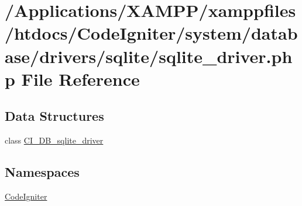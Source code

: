 \hypertarget{sqlite__driver_8php}{}\section{/\+Applications/\+X\+A\+M\+P\+P/xamppfiles/htdocs/\+Code\+Igniter/system/database/drivers/sqlite/sqlite\+\_\+driver.php File Reference}
\label{sqlite__driver_8php}
\subsection*{Data Structures}
\begin{DoxyCompactItemize}
\item 
class \mbox{\hyperlink{class_c_i___d_b__sqlite__driver}{C\+I\+\_\+\+D\+B\+\_\+sqlite\+\_\+driver}}
\end{DoxyCompactItemize}
\subsection*{Namespaces}
\begin{DoxyCompactItemize}
\item 
 \mbox{\hyperlink{namespace_code_igniter}{Code\+Igniter}}
\end{DoxyCompactItemize}
